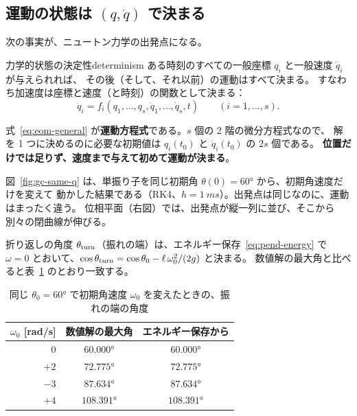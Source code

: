 \subsection{運動の状態は $(q,\dot q)$ で決まる}

次の事実が、ニュートン力学の出発点になる。

\begin{principle}{力学的状態の決定性}{determinism}
ある時刻のすべての一般座標 $q_i$ と一般速度 $\dot q_i$ が与えられれば、
その後（そして、それ以前）の運動はすべて決まる。
すなわち加速度は座標と速度（と時刻）の関数として決まる：
\begin{equation}
  \ddot q_i=f_i(q_1,\dots,q_s,\dot q_1,\dots,\dot q_s,t)\qquad(i=1,\dots,s).
  \label{eq:eom-general}
\end{equation}
\end{principle}

式~\eqref{eq:eom-general} が\textbf{運動方程式}である。$s$ 個の 2 階の微分方程式なので、
解を 1 つに決めるのに必要な初期値は $q_i(t_0)$ と $\dot q_i(t_0)$ の $2s$ 個である。
\textbf{位置だけでは足りず、速度まで与えて初めて運動が決まる}。

図~\ref{fig:gc-same-q} は、単振り子を同じ初期角 $\theta(0)=\ang{60}$ から、初期角速度だけを変えて
動かした結果である（RK4、$h=\qty{1}{ms}$）。出発点は同じなのに、運動はまったく違う。
位相平面（右図）では、出発点が縦一列に並び、そこから別々の閉曲線が伸びる。


折り返しの角度 $\theta_{\rm turn}$（振れの端）は、エネルギー保存~\eqref{eq:pend-energy} で
$\omega=0$ とおいて、$\cos\theta_{\rm turn}=\cos\theta_0-\ell\,\omega_0^2/(2g)$ と決まる。
数値解の最大角と比べると表~\ref{tab:turning} のとおり一致する。

\begin{table}[htbp]
\centering
\caption{同じ $\theta_0=\ang{60}$ で初期角速度 $\omega_0$ を変えたときの、振れの端の角度}
\label{tab:turning}
\begin{tabular}{rcc}
\toprule
$\omega_0$ [rad/s] & 数値解の最大角 & エネルギー保存から \\
\midrule
$0$  & $\ang{60.000}$  & $\ang{60.000}$ \\
$+2$ & $\ang{72.775}$  & $\ang{72.775}$ \\
$-3$ & $\ang{87.634}$  & $\ang{87.634}$ \\
$+4$ & $\ang{108.391}$ & $\ang{108.391}$ \\
\bottomrule
\end{tabular}
\end{table}

